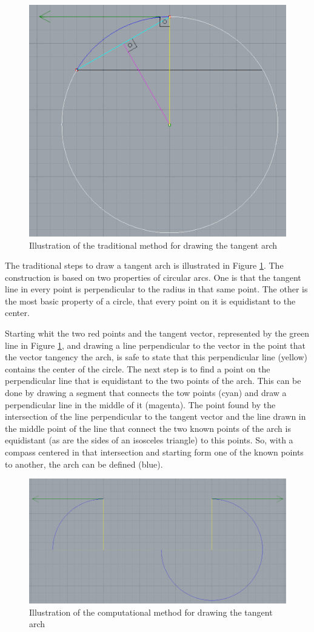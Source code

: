 \documentclass[preprint,12pt,3p]{elsarticle}
\begin{document}
\begin{figure}[!h]
\begin{center}
\includegraphics[width=0.5
\textwidth]{classicalarch.png}
\caption{Illustration of the traditional method for drawing the tangent arch}
\label{figura:classicalarch}
\end{center}
\end{figure}

The traditional steps to draw a tangent arch is illustrated in Figure \ref{figura:classicalarch}. The construction is based on two properties of circular arcs. One is that the tangent line in every point is perpendicular to the radius in that same point. The other is the most basic property of a circle, that every point on it is equidistant to the center.

Starting whit the two red points and the  tangent vector, represented by the green line in Figure \ref{figura:classicalarch}, and drawing a line perpendicular to the vector in the point that the vector tangency the arch, is safe to state that this perpendicular line (yellow) contains the center of the circle. The next step is to find a point on the perpendicular line that is equidistant to the two points of the arch. This can be done by drawing a segment that connects the tow points (cyan) and draw a perpendicular line in the middle of it (magenta). The point found by the intersection of the line perpendicular to the tangent vector and the line drawn in the middle point of the line that connect the two known points of the arch is equidistant (as are the sides of an isosceles triangle) to this points. So, with a compass centered in that intersection and starting form one of the known points to another, the arch can be defined (blue).

\begin{figure}[!h]
\begin{center}
\includegraphics[width=0.5
\textwidth]{computationalarch.png}
\caption{Illustration of the computational method for drawing the tangent arch}
\label{figura:computationalarch}
\end{center}
\end{figure}
\end{document}
